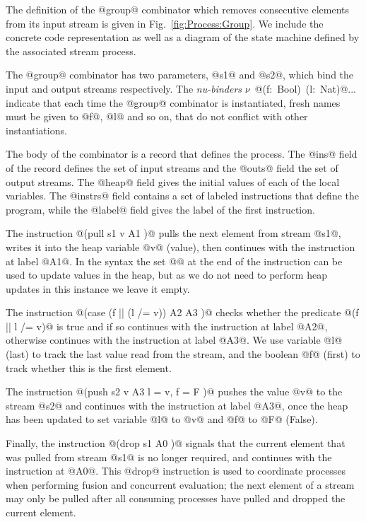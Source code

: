 The definition of the @group@ combinator which removes consecutive elements from its input stream is given in Fig.~\ref{fig:Process:Group}. We include the concrete code representation as well as a diagram of the state machine defined by the associated stream process.

The @group@ combinator has two parameters, @s1@ and @s2@, which bind the input and output streams respectively. The \emph{nu-binders} \mbox{$\nu$ @(f: Bool) (l: Nat)@...} indicate that each time the @group@ combinator is instantiated, fresh names must be given to @f@, @l@ and so on, that do not conflict with other instantiations. 

The body of the combinator is a record that defines the process. The @ins@ field of the record defines the set of input streams and the @outs@ field the set of output streams. The @heap@ field gives the initial values of each of the local variables. The @instrs@ field contains a set of labeled instructions that define the program, while the @label@ field gives the label of the first instruction. 

The instruction @(pull s1 v A1 {})@ pulls the next element from stream @s1@, writes it into the heap variable @v@ (value), then continues with the instruction at label @A1@. In the syntax the set @{}@ at the end of the instruction can be used to update values in the heap, but as we do not need to perform heap updates in this instance we leave it empty. 

The instruction @(case (f || (l /= v)) A2 {} A3 {})@ checks whether the predicate @(f || l /= v)@ is true and if so continues with the instruction at label @A2@, otherwise continues with the instruction at label @A3@. We use variable @l@ (last) to track the last value read from the stream, and the boolean @f@ (first) to track whether this is the first element.

The instruction @(push s2 v A3 { l = v, f = F })@ pushes the value @v@ to the stream @s2@ and continues with the instruction at label @A3@, once the heap has been updated to set variable @l@ to @v@ and @f@ to @F@ (False). 

Finally, the instruction @(drop s1 A0 {})@ signals that the current element that was pulled from stream @s1@ is no longer required, and continues with the instruction at @A0@.
This @drop@ instruction is used to coordinate processes when performing fusion and concurrent evaluation; the next element of a stream may only be pulled after all consuming processes have pulled and dropped the current element.

